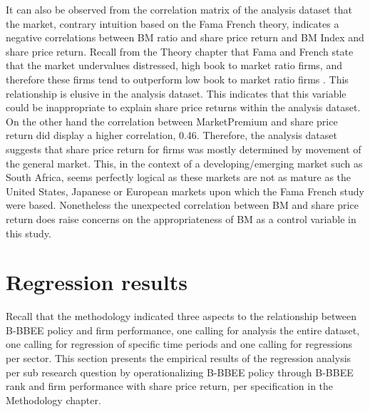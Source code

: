 It can also be observed from the correlation matrix of the analysis dataset that the market, contrary intuition based on the Fama French theory, indicates a negative correlations between BM ratio and share price return and BM Index and share price return. Recall from the Theory chapter that Fama and French state that the market undervalues distressed, high book to market ratio firms, and therefore these firms tend to outperform low book to market ratio firms \cite[p1975]{N52}. This relationship is elusive in the analysis dataset. This indicates that this variable could be inappropriate to explain share price returns within the analysis dataset. On the other hand the correlation between MarketPremium and  share price return did display a higher correlation, 0.46. Therefore, the analysis dataset suggests that share price return for firms was mostly determined by movement of the general market. This, in the context of a developing/emerging market such as South Africa, seems perfectly logical as these markets are not as mature as the United States, Japanese or European markets upon which the Fama French study were based. Nonetheless the unexpected correlation between BM and share price return does raise concerns on the appropriateness of BM as a control variable in this study.
\section{Regression results}
Recall that the methodology indicated three aspects to the relationship between B-BBEE policy and firm performance, one calling for analysis the entire dataset, one calling for regression of specific time periods and one calling for regressions per sector. This section presents the empirical results of the regression analysis per sub research question by operationalizing B-BBEE policy through B-BBEE rank and firm performance with share price return, per specification in the Methodology chapter.
